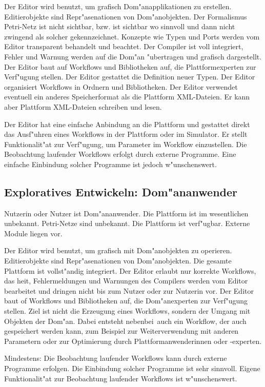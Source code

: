 \documentclass[a4paper,12pt]{article}
\newlength{\st}\setlength{\st}{0pt}
\begin{document}
Der Editor wird benutzt, um grafisch Dom"anapplikationen zu
erstellen. Editierobjekte sind Repr"asenationen von
Dom"anobjekten. Der Formalismus Petri-Netz ist nicht sichtbar,
bzw. ist sichtbar wo sinnvoll und dann nicht zwingend als solcher
gekennzeichnet. Konzepte wie Typen und Ports werden vom Editor
transparent behandelt und beachtet. Der Compiler ist voll integriert,
Fehler und Warnung werden auf die Dom"an "ubertragen und grafisch
dargestellt. Der Editor baut auf Workflows und Bibliotheken auf, die
Plattformexperten zur Verf"ugung stellen. Der Editor gestattet die
Definition neuer Typen. Der Editor organisiert Workflows in Ordnern
und Bibliotheken. Der Editor verwendet eventuell ein anderes
Speicherformat als die Plattform XML-Dateien. Er kann aber Plattform
XML-Dateien schreiben und lesen.

Der Editor hat eine einfache Anbindung an die Plattform und gestattet
direkt das Ausf"uhren eines Workflows in der Plattform oder im
Simulator. Er stellt Funktionalit"at zur Verf"ugung, um Parameter im
Workflow einzustellen. Die Beobachtung laufender Workflows erfolgt
durch externe Programme. Eine einfache Einbindung solcher Programme
ist jedoch w"unschenswert.

\subsection{Exploratives Entwickeln: Dom"ananwender}

Nutzerin oder Nutzer ist Dom"ananwender. Die Plattform ist im
wesentlichen unbekannt. Petri-Netze sind unbekannt. Die Plattform ist
verf"ugbar. Externe Module liegen vor.

Der Editor wird benutzt, um grafisch mit Dom"anobjekten zu
operieren. Editierobjekte sind Repr"asenationen von
Dom"anobjekten. Die gesamte Plattform ist vollst"andig integriert. Der
Editor erlaubt nur korrekte Workflows, das hei\3t, Fehlermeldungen und
Warnungen des Compilers werden vom Editor bearbeitet und dringen nicht
bis zum Nutzer oder zur Nutzerin vor. Der Editor baut of Workflows und
Bibliotheken auf, die Dom"anexperten zur Verf"ugung stellen. Ziel ist
nicht die Erzeugung eines Workflows, sondern der Umgang mit Objekten
der Dom"an. Dabei entsteht \glqq nebenbei\grqq\ auch ein Workflow, der
auch gespeichert werden kann, zum Beispiel zur Weiterverwendung mit
anderen Parametern oder zur Optimierung durch Plattformanwenderinnen
oder -experten.

Mindestens: Die Beobachtung laufender Workflows kann durch externe
Programme erfolgen. Die Einbindung solcher Programme ist sehr
sinnvoll. Eigene Funktionalit"at zur Beobachtung laufender Workflows
ist w"unschenswert.
\end{document}
